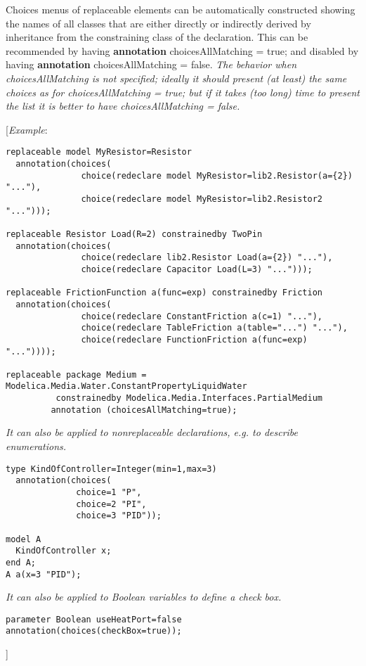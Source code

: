 Choices menus of replaceable elements can be automatically constructed
showing the names of all classes that are either directly or indirectly
derived by inheritance from the constraining class of the declaration.
This can be recommended by having \textbf{annotation} choicesAllMatching
= true; and disabled by having \textbf{annotation} choicesAllMatching =
false. \emph{The behavior when choicesAllMatching is not specified;
ideally it should present (at least) the same choices as for
choicesAllMatching = true; but if it takes (too long) time to present
the list it is better to have choicesAllMatching = false.}

{[}\emph{Example}:
\begin{lstlisting}[language=modelica]
replaceable model MyResistor=Resistor
  annotation(choices(
               choice(redeclare model MyResistor=lib2.Resistor(a={2}) "..."),
               choice(redeclare model MyResistor=lib2.Resistor2 "...")));

replaceable Resistor Load(R=2) constrainedby TwoPin
  annotation(choices(
               choice(redeclare lib2.Resistor Load(a={2}) "..."),
               choice(redeclare Capacitor Load(L=3) "...")));

replaceable FrictionFunction a(func=exp) constrainedby Friction
  annotation(choices(
               choice(redeclare ConstantFriction a(c=1) "..."),
               choice(redeclare TableFriction a(table="...") "..."),
               choice(redeclare FunctionFriction a(func=exp) "..."))));

replaceable package Medium = Modelica.Media.Water.ConstantPropertyLiquidWater
          constrainedby Modelica.Media.Interfaces.PartialMedium
	     annotation (choicesAllMatching=true);
\end{lstlisting}

\emph{It can also be applied to nonreplaceable declarations, e.g. to
describe enumerations.}
\begin{lstlisting}[language=modelica]
type KindOfController=Integer(min=1,max=3)
  annotation(choices(
              choice=1 "P",
              choice=2 "PI",
              choice=3 "PID"));

model A
  KindOfController x;
end A;
A a(x=3 "PID");
\end{lstlisting}

\emph{It can also be applied to Boolean variables to define a check
box.}
\begin{lstlisting}[language=modelica]
parameter Boolean useHeatPort=false annotation(choices(checkBox=true));
\end{lstlisting}

{]}
